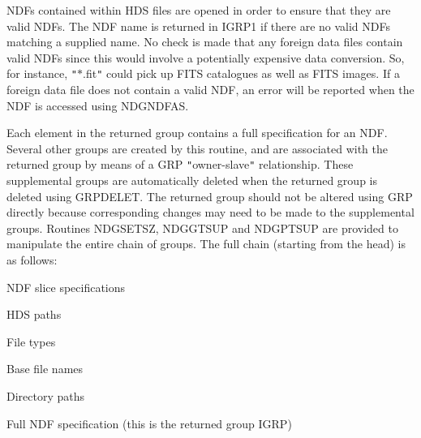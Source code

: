 \documentclass[twoside,11pt]{article}
\renewcommand{\_}{\texttt{\symbol{95}}}
\newcommand{\sstitem}{\item}
\newcommand{\sstitem}{\item}
\begin{document}
{{{         \sstitem
         NDFs contained within HDS files are opened in order to ensure
         that they are valid NDFs. The NDF name is returned in IGRP1 if there
         are no valid NDFs matching a supplied name. No check is made that any
         foreign data files contain valid NDFs since this would involve a
         potentially expensive data conversion. So, for instance, {\tt "}$*$.fit{\tt "} could
         pick up FITS catalogues as well as FITS images. If a foreign data file
         does not contain a valid NDF, an error will be reported when the NDF
         is accessed using NDG\_NDFAS.

         \sstitem
         Each element in the returned group contains a full specification
         for an NDF. Several other groups are created by this routine, and
         are associated with the returned group by means of a GRP {\tt "}owner-slave{\tt "}
         relationship. These supplemental groups are automatically deleted
         when the returned group is deleted using GRP\_DELET. The returned
         group should not be altered using GRP directly because corresponding
         changes may need to be made to the supplemental groups. Routines
         NDG\_SETSZ, NDG\_GTSUP and NDG\_PTSUP are provided to manipulate the
         entire chain of groups. The full chain (starting from the head) is
         as follows:

         \sstitem
            NDF slice specifications

         \sstitem
            HDS paths

         \sstitem
            File types

         \sstitem
            Base file names

         \sstitem
            Directory paths

         \sstitem
            Full NDF specification (this is the returned group IGRP)
      }
   }
}
\end{document}
